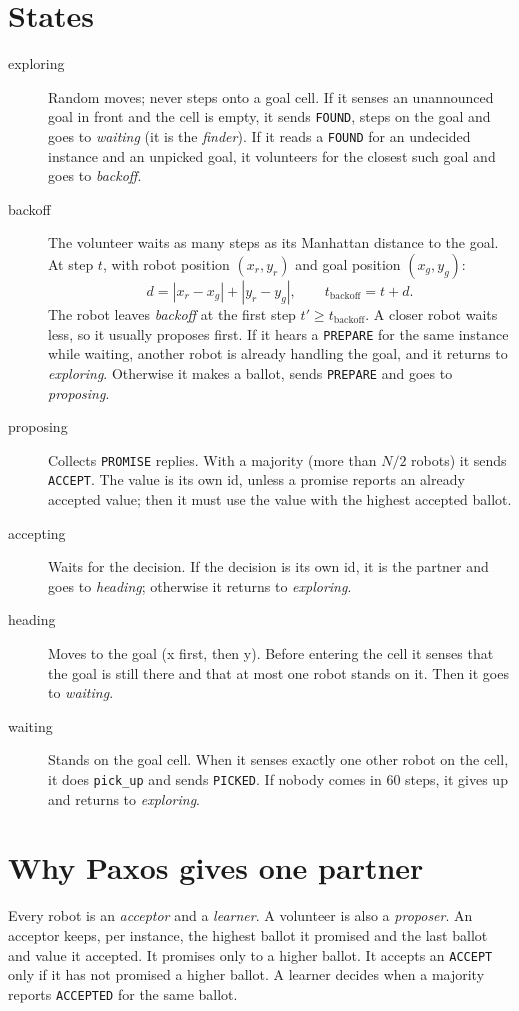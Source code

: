 \documentclass[11pt,a4paper]{article}
\begin{document}
\section{States}\label{sec:states}
\begin{description}
\item[exploring] Random moves; never steps onto a goal cell. If it senses an
unannounced goal in front and the cell is empty, it sends \texttt{FOUND}, steps on
the goal and goes to \emph{waiting} (it is the \emph{finder}). If it reads a
\texttt{FOUND} for an undecided instance and an unpicked goal, it volunteers for
the closest such goal and goes to \emph{backoff}.

\item[backoff] The volunteer waits as many steps as its Manhattan distance to the
goal. At step $t$, with robot position $(x_r,y_r)$ and goal position $(x_g,y_g)$:
\[
  d = |x_r - x_g| + |y_r - y_g|, \qquad t_{\text{backoff}} = t + d .
\]
The robot leaves \emph{backoff} at the first step $t' \ge t_{\text{backoff}}$.
A closer robot waits less, so it usually proposes first. If it hears a
\texttt{PREPARE} for the same instance while waiting, another robot is already
handling the goal, and it returns to \emph{exploring}. Otherwise it makes a ballot,
sends \texttt{PREPARE} and goes to \emph{proposing}.

\item[proposing] Collects \texttt{PROMISE} replies. With a majority (more than
$N/2$ robots) it sends \texttt{ACCEPT}. The value is its own id, unless a promise
reports an already accepted value; then it must use the value with the highest
accepted ballot.

\item[accepting] Waits for the decision. If the decision is its own id, it is the
partner and goes to \emph{heading}; otherwise it returns to \emph{exploring}.

\item[heading] Moves to the goal (x first, then y). Before entering the cell it
senses that the goal is still there and that at most one robot stands on it.
Then it goes to \emph{waiting}.

\item[waiting] Stands on the goal cell. When it senses exactly one other robot on
the cell, it does \texttt{pick\_up} and sends \texttt{PICKED}. If nobody comes in
60 steps, it gives up and returns to \emph{exploring}.
\end{description}

\section{Why Paxos gives one partner}
Every robot is an \emph{acceptor} and a \emph{learner}. A volunteer is also a
\emph{proposer}. An acceptor keeps, per instance, the highest ballot it promised
and the last ballot and value it accepted. It promises only to a higher ballot. It
accepts an \texttt{ACCEPT} only if it has not promised a higher ballot. A learner
decides when a majority reports \texttt{ACCEPTED} for the same ballot.
\end{document}
